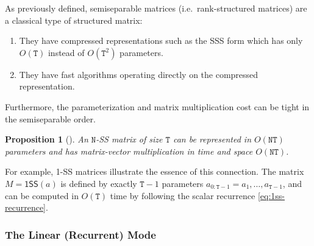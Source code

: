 \documentclass{article}
\newcommand{\citet}{\textcite}
\newtheorem{proposition}[theorem]{Proposition}
\begin{document}
As previously defined, semiseparable matrices (i.e.\ rank-structured matrices) are a classical type of structured matrix:
\begin{enumerate}[label=(\roman*)]
  \item They have compressed representations such as the SSS form which has only $O(\mathtt{T})$ instead of $O(\mathtt{T}^2)$ parameters.
  \item They have fast algorithms operating directly on the compressed representation.
\end{enumerate}
Furthermore, the parameterization and matrix multiplication cost can be tight in the semiseparable order.
\begin{proposition}[\citet{pernet2023exact}]
  \label{prop:ss-mvm}
  An $\mathtt{N}$-SS matrix of size $\mathtt{T}$ can be represented in $O(\mathtt{NT})$ parameters and has matrix-vector multiplication in time and space $O(\mathtt{NT})$.
\end{proposition}

For example, 1-SS matrices illustrate the essence of this connection.
The matrix $M = \mathsf{1SS}(a)$ is defined by exactly $\mathtt{T}-1$ parameters $a_{0:\mathtt{T}-1} = a_1, \dots, a_{\mathtt{T}-1}$,
and can be computed in $O(\mathtt{T})$ time by following the scalar recurrence \eqref{eq:1ss-recurrence}.

\subsubsection{The Linear (Recurrent) Mode}
\label{sec:ssm:algorithms:linear}
\end{document}
